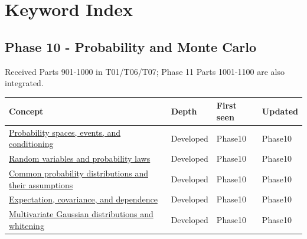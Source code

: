 \hypertarget{appendix-a6d556a4ef50}{}\label{referencestart:appendix-a6d556a4ef50}
\section{Keyword Index}\label{appendix-a6d556a4ef50-keyword-index}

\subsection{Phase 10 - Probability and Monte Carlo}\label{appendix-a6d556a4ef50-phase-10---probability-and-monte-carlo}

Received Parts 901-1000 in T01/T06/T07; Phase 11 Parts 1001-1100 are also integrated.

{\def\LTcaptype{none} %
\begin{longtable}[]{@{}
  >{\raggedright\arraybackslash}p{}
  >{\raggedright\arraybackslash}p{}
  >{\raggedright\arraybackslash}p{}
  >{\raggedright\arraybackslash}p{}@{}}
\toprule\noalign{}
\begin{minipage}[b]{\linewidth}\raggedright
Concept
\end{minipage} & \begin{minipage}[b]{\linewidth}\raggedright
Depth
\end{minipage} & \begin{minipage}[b]{\linewidth}\raggedright
First seen
\end{minipage} & \begin{minipage}[b]{\linewidth}\raggedright
Updated
\end{minipage} \\
\midrule\noalign{}
\endhead
\bottomrule\noalign{}
\endlastfoot
\hyperref[appendix-f1ef323f6ed7]{Probability spaces, events, and conditioning} & Developed & Phase10 & Phase10 \\
\hyperref[appendix-4d0203f7944f]{Random variables and probability laws} & Developed & Phase10 & Phase10 \\
\hyperref[appendix-a2360b435383]{Common probability distributions and their assumptions} & Developed & Phase10 & Phase10 \\
\hyperref[appendix-54c383df9992]{Expectation, covariance, and dependence} & Developed & Phase10 & Phase10 \\
\hyperref[appendix-12bbe185dbe5]{Multivariate Gaussian distributions and whitening} & Developed & Phase10 & Phase10 \\

\end{longtable}}
